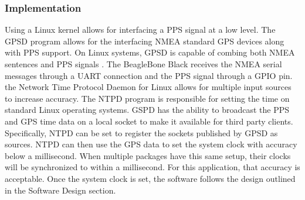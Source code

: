 \subsubsection{Implementation}
Using a Linux kernel allows for interfacing a PPS signal at a low level. The GPSD program allows for the interfacing NMEA standard GPS devices along with
PPS support. On Linux systems, GPSD is capable of combing both NMEA sentences and PPS signals \cite{GPSD}. The BeagleBone Black receives the NMEA serial
messages through a UART connection and the PPS signal through a GPIO pin. the Network Time Protocol Daemon for Linux allows for multiple input sources to
increase accuracy. The NTPD program is responsible for setting the time on standard Linux operating systems. GSPD has the ability to broadcast the PPS
and GPS time data on a local socket to make it available for third party clients. Specifically, NTPD can be set to register the sockets published by
GPSD as sources. NTPD can then use the GPS data to set the system clock with accuracy below a millisecond. When multiple packages have this same
setup, their clocks will be synchronized to within a millisecond. For this application, that accuracy is acceptable. Once the system clock is set,
the software follows the design outlined in the Software Design section. 
